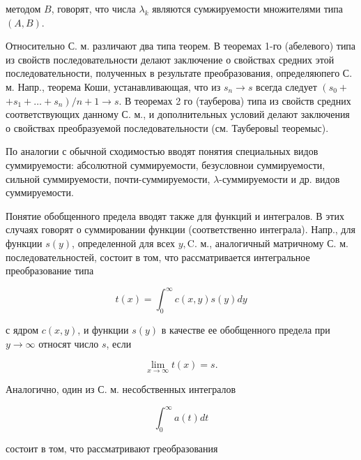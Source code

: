 \documentclass[10pt]{article}
\begin{document}
методом $B$, говорят, что числа $\lambda_{k}$ являются сумжируемости множителями типа $(A, B)$.



Относительно С. м. различают два типа теорем. В теоремах 1-го (абелевого) типа из свойств последовательности делают заключение о свойствах средних этой последовательности, полученных в результате преобразования, определяюпего С. м. Напр., теорема Коши, устанавливающая, что из $s_{n} \rightarrow s$ всегда следует $\left(s_{0}+\right.$ $\left.+s_{1}+\ldots+s_{n}\right) / n+1 \rightarrow s$. В теоремах 2 го (тауберова) типа из свойств средних соответствующих данному С. м., и дополнительных условий делают заключения о свойствах преобразуемой последовательности (см. Тауберовыl теоремыс).



По аналогии с обычной сходимостью вводят понятия специальных видов суммируемости: абсолютной суммируемости, безусловнои суммируемости, сильной суммируемости, почти-суммируемости, $\lambda$-суммируемости и др. видов суммируемости.



Понятие обобщенного предела вводят также для функций и интегралов. В этих случаях говорят о суммировании функции (соответственно интеграла). Напр., для функции $s(y)$, определенной для всех $y, \mathrm{C}$. м., аналогичный матричному С. м. последовательностей, состоит в том, что рассматривается интегральное преобразование типа



\[

t(x)=\int_{0}^{\infty} c(x, y) s(y) d y

\]



с ядром $c(x, y)$, и функции $s(y)$ в качестве ее обобщенного предела при $y \rightarrow \infty$ относят число $s$, если



\[

\lim _{x \rightarrow \infty} t(x)=s .

\]



Аналогично, один из С. м. несобственных интегралов



\[

\int_{0}^{\infty} a(t) d t

\]



состоит в том, что рассматривают греобразования
\end{document}
